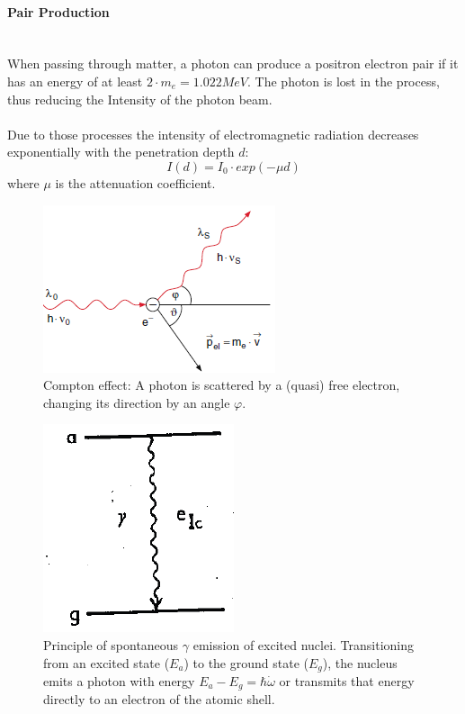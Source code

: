\paragraph{Pair Production} \ \\
When passing through matter, a photon can produce a positron electron pair if it has an energy of at least $2\cdot m_e=\unit{1.022}{MeV}$. The photon is lost in the process, thus reducing the Intensity of the photon beam.\\ \ \\
Due to those processes the intensity of electromagnetic radiation decreases exponentially with the penetration depth $d$:
\begin{equation}
I(d)=I_0 \cdot exp(-\mu d)
\end{equation}
where $\mu$ is the attenuation coefficient.
\begin{figure}[h]
	\centering
	\includegraphics[width=0.5\linewidth]{graphics/Compton}
	\caption[Compton scattering]{Compton effect: A photon is scattered by a (quasi) free electron, changing its direction by an angle $\varphi$. \cite{Demtröder} }
	\label{fig:principles:Compton}
\end{figure}

\begin{figure}[H]
	\centering
	\includegraphics[height=0.18\textheight]{graphics/Emission}
	\caption[Spontaneous $\gamma$ emission]{Principle of spontaneous $\gamma$ emission of excited nuclei. Transitioning from an excited state ($E_a$) to the ground state ($E_g$), the nucleus emits a photon with energy $E_a-E_g=\hbar\dot \omega$ or transmits that energy directly to an electron of the atomic shell. \cite{Wegener}}
	\label{fig:principles:Emission}
\end{figure}
